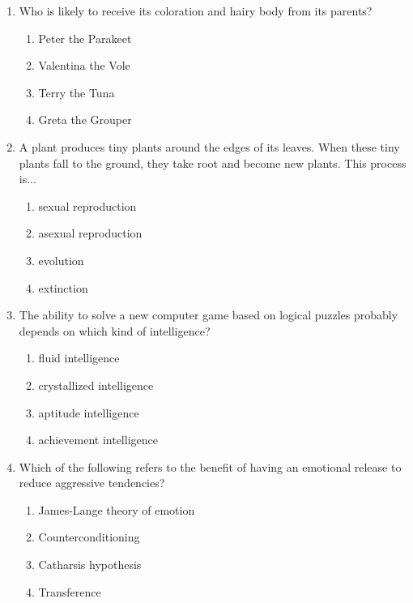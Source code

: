 \documentclass[12pt]{article}
\begin{document}
\begin{enumerate}[label=\arabic*.]
\begin{enumerate}[label=(\alph*)]
    \item Their tool technology was less advanced.
    \item They were unsuited to the hotter climates of the sub-Saharan savanna.
    \item The Neandertal body type required greater amounts of calories to sustain.
\end{enumerate}
\item Who is likely to receive its coloration and hairy body from its parents?
\begin{enumerate}[label=(\alph*)]
    \item Peter the Parakeet
    \item Valentina the Vole
    \item Terry the Tuna
    \item Greta the Grouper
\end{enumerate}
\item A plant produces tiny plants around the edges of its leaves. When these tiny plants fall to the ground, they take root and become new plants. This process is...
\begin{enumerate}[label=(\alph*)]
    \item sexual reproduction
    \item asexual reproduction
    \item evolution
    \item extinction
\end{enumerate}
\item The ability to solve a new computer game based on logical puzzles probably depends on which kind of intelligence?
\begin{enumerate}[label=(\alph*)]
    \item fluid intelligence
    \item crystallized intelligence
    \item aptitude intelligence
    \item achievement intelligence
\end{enumerate}
\item Which of the following refers to the benefit of having an emotional release to reduce aggressive tendencies?
\begin{enumerate}[label=(\alph*)]
    \item James-Lange theory of emotion
    \item Counterconditioning
    \item Catharsis hypothesis
    \item Transference

\end{enumerate}
\end{enumerate}
\end{document}
